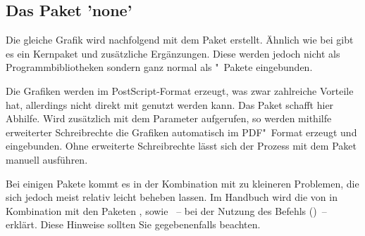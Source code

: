 \documentclass[%
  english,ngerman,%
  cdgeometry=no,DIV=12,%
  automark,%
  listof=toc,%
]{tudscrartcl}
\begin{document}
\subsection{Das Paket 'none'}
Die gleiche Grafik wird nachfolgend mit dem Paket  erstellt. 
Ähnlich wie bei  gibt es ein Kernpaket und zusätzliche 
Ergänzungen. Diese werden jedoch nicht als Programmbibliotheken sondern ganz 
normal als "~Pakete eingebunden.
%
\begin{Hint}
\usepackage{pstricks,pst-node}
\end{Hint}
%
Die Grafiken werden im PostScript-Format erzeugt, was zwar zahlreiche Vorteile 
hat, allerdings nicht direkt mit  genutzt werden kann. Das 
Paket  schafft hier Abhilfe. Wird  
zusätzlich mit dem Parameter  aufgerufen, so werden 
mithilfe erweiterter Schreibrechte die Grafiken automatisch im PDF"~Format 
erzeugt und eingebunden. Ohne erweiterte Schreibrechte lässt sich der Prozess 
mit dem Paket  manuell ausführen.
%
\begin{Hint}
\usepackage{auto-pst-pdf}
\end{Hint}
%
Bei einigen Pakete kommt es in der Kombination mit  zu 
kleineren Problemen, die sich jedoch meist relativ leicht beheben lassen. Im 
Handbuch wird die  
von  in Kombination mit den Paketen , 
 sowie ~-- bei der Nutzung des Befehls 
()~-- erklärt. Diese Hinweise sollten Sie 
gegebenenfalls beachten.
\end{document}

